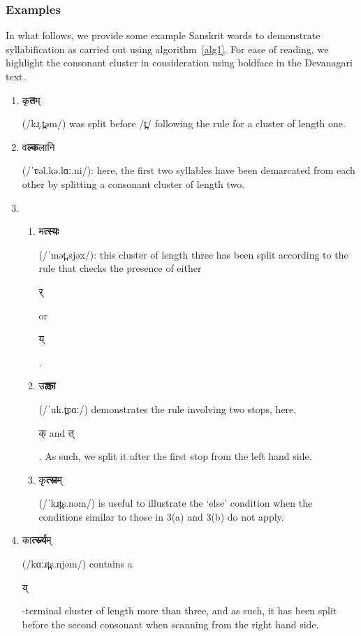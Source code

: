 \documentclass[10pt,a4paper]{article}
\newcommand{\sansk}[1]{\begin{sanskrit}#1\end{sanskrit}}
\begin{document}
\subsubsection{Examples}
In what follows, we provide some example Sanskrit words to demonstrate syllabification as carried out using algorithm~\ref{alg1}. For ease of reading, we highlight the consonant cluster in consideration using boldface in the Devanagari text.
\begin{enumerate}
	\item \sansk{कृ\textbf{त}म्} (/kɹ̩.t̪əm/) was split before /t̪/ following the rule for a cluster of length one.
	
	\item \sansk{व\textbf{ल्क}लानि} (/ˈʋəl.kə.lɑː.ni/): here, the first two syllables have been demarcated from each other by splitting a consonant cluster of length two.
	
	\item 
	\begin{enumerate}
		\item \sansk{म\textbf{त्स्यः}} (/ˈmət̪.sjəx/): this cluster of length three has been split according to the rule that checks the presence of either \sansk{र्} or \sansk{य्}.
		
		\item
		\sansk{उ\textbf{क्त्वा}} (/ˈuk.t̪ʋɑː/) demonstrates the rule involving two stops, here, \sansk{क् and त्}. As such, we split it after the first stop from the left hand side.
		
		\item
		\sansk{कृ\textbf{त्स्न}म्} (/ˈkɹ̩t̪s.nəm/) is useful to illustrate the `else' condition when the conditions similar to those in 3(a) and 3(b) do not apply.
	\end{enumerate}
	
	\item
		
		\sansk{का\textbf{र्त्स्न्य}म्} (/kɑːɹt̪s.njəm/) contains a \sansk{य्}-terminal cluster of length more than three, and as such, it has been split before the second consonant when scanning from the right hand side.
		
	
\end{enumerate}
\end{document}
